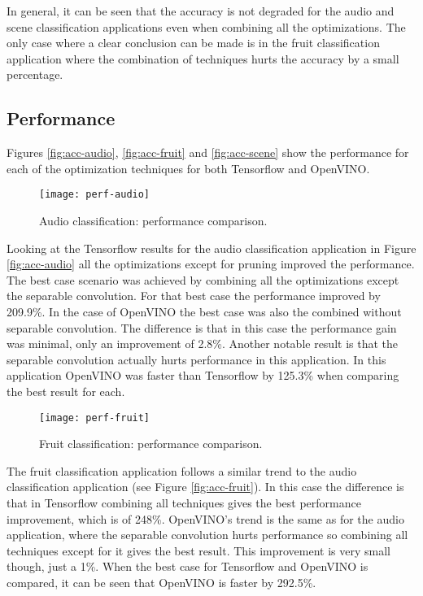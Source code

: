 In general, it can be seen that the accuracy is not degraded for the audio and scene classification applications even when combining all the optimizations. The only case where a clear conclusion can be made is in the fruit classification application where the combination of techniques hurts the accuracy by a small percentage.

\subsection{Performance}

Figures \ref{fig:acc-audio}, \ref{fig:acc-fruit} and \ref{fig:acc-scene} show the performance for each of the optimization techniques for both Tensorflow and OpenVINO.

\begin{figure}[thbp]
	\centering
	\texttt{[image: perf-audio]}
	\caption{Audio classification: performance comparison.}
	\label{fig:perf-audio}
\end{figure}

Looking at the Tensorflow results for the audio classification application in Figure \ref{fig:acc-audio} all the optimizations except for pruning improved the performance. The best case scenario was achieved by combining all the optimizations except the separable convolution. For that best case the performance improved by 209.9\%. In the case of OpenVINO the best case was also the combined without separable convolution. The difference is that in this case the performance gain was minimal, only an improvement of 2.8\%. Another notable result is that the separable convolution actually hurts performance in this application. In this application OpenVINO was faster than Tensorflow by 125.3\% when comparing the best result for each.

\begin{figure}[thbp]
	\centering
	\texttt{[image: perf-fruit]}
	\caption{Fruit classification: performance comparison.}
	\label{fig:perf-fruit}
\end{figure}

The fruit classification application follows a similar trend to the audio classification application (see Figure \ref{fig:acc-fruit}). In this case the difference is that in Tensorflow combining all techniques gives the best performance improvement, which is of 248\%. OpenVINO's trend is the same as for the audio application, where the separable convolution hurts performance so combining all techniques except for it gives the best result. This improvement is very small though, just a 1\%. When the best case for Tensorflow and OpenVINO is compared, it can be seen that OpenVINO is faster by 292.5\%.

